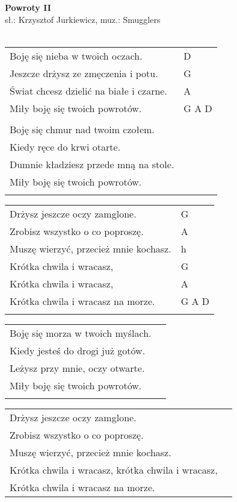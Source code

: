 \documentclass[a5paper]{article}
\begin{document}


\noindent
\fontsize{12pt}{15pt}\selectfont
\textbf{Powroty II} \\
\fontsize{8pt}{10pt}\selectfont
sł.: Krzysztof Jurkiewicz, muz.: Smugglers \\ \\
\fontsize{10pt}{12pt}\selectfont
{}
\begin{tabular}{@{}p{8.00cm}p{3cm}@{}}
\noindent
Boję się nieba w twoich oczach. & D \\
Jeszcze drżysz ze zmęczenia i potu. & G \\
Świat chcesz dzielić na białe i czarne. & A \\
Miły boję się twoich powrotów. & G A D \\ \\

Boję się chmur nad twoim czołem.\\
Kiedy ręce do krwi otarte.\\
Dumnie kładziesz przede mną na stole.\\
Miły boję się twoich powrotów.\\ \\
\end{tabular}

\noindent
\begin{tabular}{@{}p{7.00cm}p{3cm}@{}}
Drżysz jeszcze oczy zamglone. & G \\
Zrobisz wszystko o co poproszę. & A \\
Muszę wierzyć, przecież mnie kochasz. & h \\
Krótka chwila i wracasz, & G \\
Krótka chwila i wracasz, & A \\
Krótka chwila i wracasz na morze. & G A D \\ \\
\end{tabular}

\noindent
\begin{tabular}{@{}p{7.00cm}p{3cm}@{}}
Boję się morza w twoich myślach.\\
Kiedy jesteś do drogi już gotów.\\
Leżysz przy mnie, oczy otwarte.\\
Miły boję się twoich powrotów.\\\\
\end{tabular}

\noindent
\begin{tabular}{@{}p{8.00cm}p{3cm}@{}}
Drżysz jeszcze oczy zamglone.\\
Zrobisz wszystko o co poproszę.\\
Muszę wierzyć, przecież mnie kochasz.\\
Krótka chwila i wracasz, krótka chwila i wracasz,\\
Krótka chwila i wracasz na morze.
\end{tabular}
\end{document}
